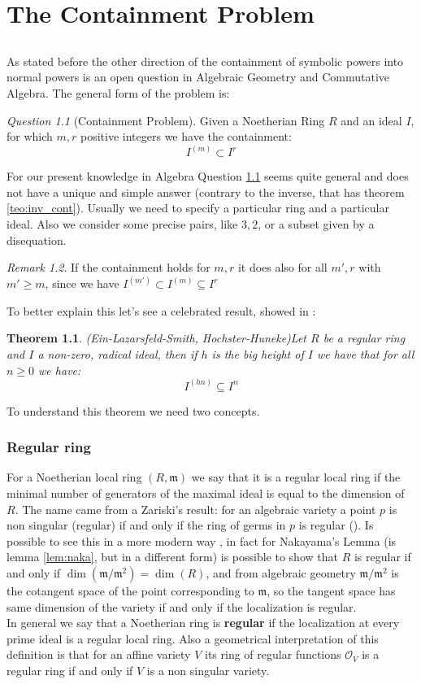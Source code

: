 \documentclass[notitlepage, a4]{book}
\theoremstyle{plain}
\newtheorem{teo}{Theorem}[section]
\theoremstyle{remark}
\newtheorem{rem}{Remark}
\newtheorem{que}[rem]{Question}
\theoremstyle{definition}
\newcommand{\mm}{\mathfrak{m}}
\newcommand{\cont}[2]{ I^{(#1)} \subseteq I^{#2}}
\newcounter{que}
\begin{document}
\chapter{The Containment Problem} \label{cha:cont}
\section*{}
	As stated before the other direction of the containment of symbolic powers into normal powers is an open question in Algebraic Geometry and Commutative Algebra. The general form of the problem is:
	\begin{que}[Containment Problem] \label{que:cont}
		Given a Noetherian Ring $ R $ and an ideal $ I $, for which $ m,r $ positive integers we have the containment:
		$$ I^{(m)} \subset I^r $$
	\end{que}
	For our present knowledge in Algebra Question \ref{que:cont} seems quite general and does not have a unique and simple answer (contrary to the inverse, that has theorem \ref{teo:inv_cont}). Usually we need to specify a particular ring and a particular ideal. Also we consider some precise pairs, like $ 3,2 $, or a subset given by a disequation. 
	\begin{rem}
	If the containment holds for $ m,r $ it does also for all $ m' ,r $ with $ m'\geq m $, since we have $ I^{(m')} \subset \cont{m}{r} $
	\end{rem}
	To better explain this let's see a celebrated result, showed in \cite{HocHun02,EinLazSmi01}:
	\begin{teo}{(Ein-Lazarsfeld-Smith, Hochster-Huneke)}\label{teo:cont:bigh}
	Let $ R $ be a regular ring and $ I $ a non-zero, radical ideal, then if $ h $ is the big height of $ I $ we have that for all $ n \geq 0 $ we have:
	\[ \cont{hn}{n}\]	
	\end{teo} 
	
	To understand this theorem we need two concepts.
	\subsection{Regular ring}
	For a Noetherian local ring $ (R,\mm) $ we say that it is a regular local ring if the minimal number of generators of the maximal ideal is equal to the dimension of $ R $. The name came from a Zariski's result: for an algebraic variety a point $ p $ is non singular (regular) if and only if the ring of germs in $ p $ is regular (\cite{Zar40}). Is possible to see this in a more modern way , in fact for Nakayama's Lemma (is lemma \ref{lem:naka}, but in a different form) is possible to show that $ R $ is regular if and only if $ \dim(\mm / \mm^2 ) = \dim (R) $, and from algebraic geometry $ \mm /\mm^2 $ is the cotangent space of the point corresponding to $ \mm $, so the tangent space has same dimension of the variety if and only if the localization is regular.\\
	In general we say that a Noetherian ring is \textbf{regular} if the localization at every prime ideal is a regular local ring. Also a geometrical interpretation of this definition is that for an affine variety $ V $ its ring of regular functions $ \mathcal{O}_V $ is a regular ring if and only if $ V $ is a non singular variety. 
	
\end{document}
